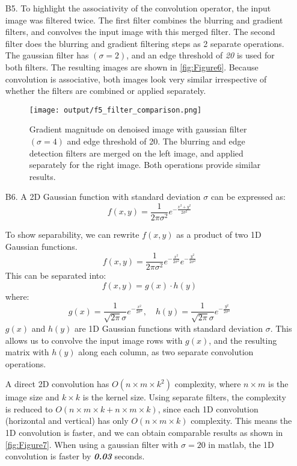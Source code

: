 \documentclass[12pt]{report}
\begin{document}
\begin{enumerate}
    \item[B5.] To highlight the associativity of the convolution operator, the input image was filtered twice. The first filter combines the blurring and gradient filters, 
    and convolves the input image with this merged filter. The second filter does the blurring and gradient filtering steps as 2 separate operations. The gaussian filter has 
    $(\sigma=2)$, and an edge threshold of \emph{20} is used for both filters. The resulting images are shown in \autoref{fig:Figure6}. Because convolution is associative, both 
    images look very similar irrespective of whether the filters are combined or applied separately.
    \begin{figure}[H]
        \centering
        \texttt{[image: output/f5\_filter\_comparison.png]}
        \caption{Gradient magnitude on denoised image with gaussian filter $(\sigma=4)$ and edge threshold of 20. The blurring and edge detection filters are merged on the left 
        image, and applied separately for the right image. Both operations provide similar results.}
        \label{fig:Figure6}
    \end{figure}

    \item[B6.] A 2D Gaussian function with standard deviation \(\sigma\) can be expressed as:
    \[
    f(x, y) = \frac{1}{2 \pi \sigma^2} e^{-\frac{x^2 + y^2}{2 \sigma^2}}
    \]

    To show separability, we can rewrite \(f(x, y)\) as a product of two 1D Gaussian functions.
    \[
    f(x, y) = \frac{1}{2 \pi \sigma^2} e^{-\frac{x^2}{2 \sigma^2}} e^{-\frac{y^2}{2 \sigma^2}}
    \]
    This can be separated into:
    \[
    f(x, y) = g(x) \cdot h(y)
    \]
    where:
    \[
    g(x) = \frac{1}{\sqrt{2 \pi} \sigma} e^{-\frac{x^2}{2 \sigma^2}}, \quad h(y) = \frac{1}{\sqrt{2 \pi} \sigma} e^{-\frac{y^2}{2 \sigma^2}}
    \]
    \( g(x) \) and \( h(y) \) are 1D Gaussian functions with standard deviation \(\sigma\). This allows us to convolve the input image rows with \( g(x) \), and the resulting 
    matrix with \( h(y) \) along each column, as two separate convolution operations.  

    A direct 2D convolution has $O(n \times m \times k^2)$ complexity, where $n \times m$ is the image size and $k \times k$ is the kernel size. Using separate filters, the 
    complexity is reduced to $O(n \times m \times k + n \times m \times k)$, since each 1D convolution (horizontal and vertical) has only $O(n \times m \times k)$ complexity. 
    This means the 1D convolution is faster, and we can obtain comparable results as shown in \autoref{fig:Figure7}. When using a gaussian filter with $\sigma=20$ in matlab, 
    the 1D convolution is faster by \textit{\textbf{0.03}} seconds.


\end{enumerate}
\end{document}
